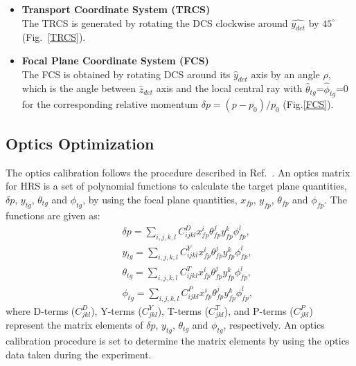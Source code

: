 \begin{itemize}
\item \textbf{Transport Coordinate System (TRCS)} \\ 
  The TRCS is generated by rotating the DCS clockwise around  $\hat{y_{det}}$ by $45^{\circ}$ (Fig.~\ref{TRCS}).

\item \textbf{Focal Plane Coordinate System (FCS)} \\
  The FCS is obtained by rotating DCS around its $\hat{y}_{det}$ axis by an angle $\rho$, which is the angle between $\hat{z}_{det}$ axis and the local central ray with $\hat{\theta}_{tg}$=$\hat{\phi}_{tg}$=0 for the corresponding relative  momentum $\delta p=(p-p_{0})/p_{0}$ (Fig.\ref{FCS}).

\end{itemize}

\subsection{Optics Optimization}
The optics calibration follows the procedure described in Ref.~\cite{nilanga_optics}. An optics matrix for HRS is a set of polynomial functions to calculate the target plane quantities, $\delta p$, $y_{tg}$, $\theta_{tg}$ and $\phi_{tg}$, by using the focal plane quantities, $x_{fp}$, $y_{fp}$, $\theta_{fp}$ and $\phi_{fp}$. The functions are given as: 
\begin{eqnarray}
  & &\delta p    = \sum_{i,j,k,l} C^{D}_{ijkl}x^{i}_{fp} \theta^{j}_{fp}y^{k}_{fp}\phi^{l}_{fp}, \\
  & &y_{tg}      = \sum_{i,j,k,l} C^{Y}_{ijkl}x^{i}_{fp} \theta^{j}_{fp}y^{k}_{fp}\phi^{l}_{fp}, \\
  & &\theta_{tg} = \sum_{i,j,k,l} C^{T}_{ijkl}x^{i}_{fp} \theta^{j}_{fp}y^{k}_{fp}\phi^{l}_{fp}, \\
  & &\phi_{tg}   = \sum_{i,j,k,l} C^{P}_{ijkl}x^{i}_{fp} \theta^{j}_{fp}y^{k}_{fp}\phi^{l}_{fp},
  \label{optics_eq}
\end{eqnarray}
where D-terms ($C^{D}_{jkl}$), Y-terms ($C^{Y}_{jkl}$), T-terms ($C^{T}_{jkl}$), and P-terms ($C^{P}_{jkl}$) represent the matrix elements of $\delta p$, $y_{tg}$, $\theta_{tg}$ and $\phi_{tg}$, respectively. An optics calibration procedure is set to determine the matrix elements by using the optics data taken during the experiment.

